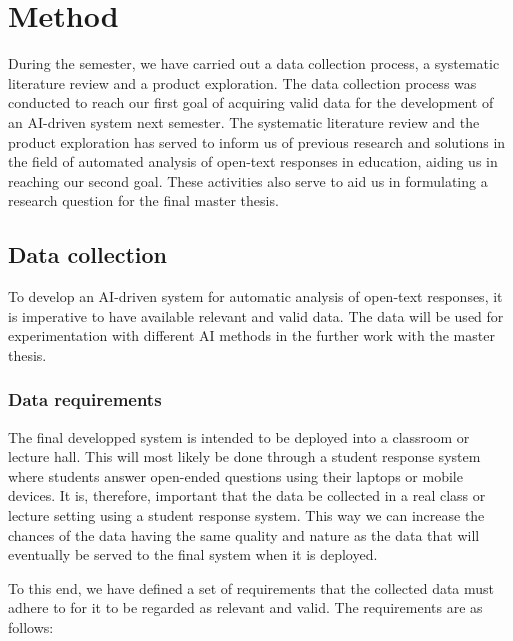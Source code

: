 \chapter{Method}\label{sec:method}

\begin{comment}
The method chapter should describe in detail which activities you undertake to answer the research questions presented in the introduction, and why they were chosen. This includes detailed descriptions of experiments, surveys, computations, data analysis, statistical tests etc.
\end{comment}

During the semester, we have carried out a data collection process, a systematic literature review and a product exploration. The data collection process was conducted to reach our first goal of acquiring valid data for the development of an AI-driven system next semester. The systematic literature review and the product exploration has served to inform us of previous research and solutions in the field of automated analysis of open-text responses in education, aiding us in reaching our second goal. These activities also serve to aid us in formulating a research question for the final master thesis.


\section{Data collection}
To develop an AI-driven system for automatic analysis of open-text responses, it is imperative to have available relevant and valid data. The data will be used for experimentation with different AI methods in the further work with the master thesis.

\subsection{Data requirements}
The final developped system is intended to be deployed into a classroom or lecture hall. This will most likely be done through a student response system where students answer open-ended questions using their laptops or mobile devices. It is, therefore, important that the data be collected in a real class or lecture setting using a student response system. This way we can increase the chances of the data having the same quality and nature as the data that will eventually be served to the final system when it is deployed.

To this end, we have defined a set of requirements that the collected data must adhere to for it to be regarded as relevant and valid. The requirements are as follows:

